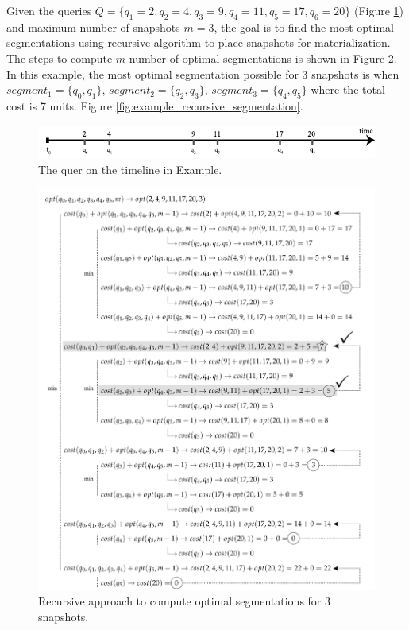 \begin{example}
	Given the queries $Q=\{q_1=2,q_2=4,q_3=9,q_4=11,q_5=17,q_6=20\}$ (Figure \ref{fig:example_recursive_queries}) and maximum number of snapshots $m=3$, the goal is to find the most optimal segmentations using recursive algorithm to place snapshots for materialization. The steps to compute $m$ number of optimal segmentations is shown in Figure \ref{fig:example_recursive_steps}. In this example, the most optimal segmentation possible for 3 snapshots is when $segment_1 = \{q_0,q_1\}$, $segment_2 = \{q_2,q_3\}$, $segment_3= \{q_4,q_5\}$ where the total cost is 7 units. Figure \ref{fig:example_recursive_segmentation}.
\label{example:recursive_segmantation}
\end{example}

\begin{figure}[b]
	\centering
	\includegraphics[width=\textwidth]{figs/example_recursive_q.pdf}
	\caption{The quer on the timeline in Example.}
	\label{fig:example_recursive_queries}
\end{figure}

\begin{figure}
	\centering
	\includegraphics[width=\textwidth]{figs/recursion_example.pdf}
	\caption{Recursive approach to compute optimal segmentations for 3 snapshots.}
	\label{fig:example_recursive_steps}
\end{figure}


